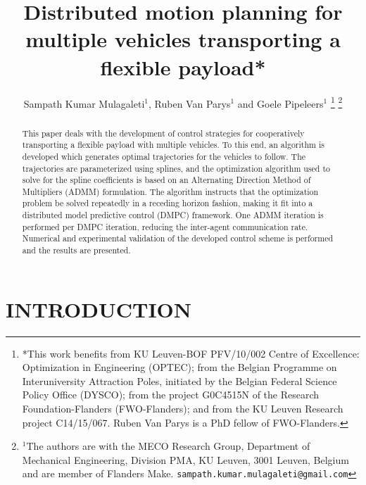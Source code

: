 \documentclass[letterpaper, 10 pt, conference]{ieeeconf}
\title{\LARGE \bf
Distributed motion planning for multiple
vehicles transporting a flexible payload*
}
\author{Sampath Kumar Mulagaleti$^{1}$, Ruben Van Parys$^{1}$ and Goele Pipeleers$^{1}$%
\thanks{*This work benefits from KU Leuven-BOF PFV/10/002 Centre of Excellence: Optimization in Engineering (OPTEC); from the Belgian Programme on Interuniversity Attraction Poles, initiated by the Belgian Federal Science Policy Office (DYSCO); from the project G0C4515N of the Research Foundation-Flanders (FWO-Flanders); and from the KU Leuven Research project C14/15/067. Ruben Van Parys is a PhD fellow of FWO-Flanders. }%
\thanks{$^{1}$The authors are with the MECO Research Group, Department of Mechanical Engineering, Division PMA, KU Leuven, 3001 Leuven, Belgium and are member of Flanders Make. \texttt{sampath.kumar.mulagaleti@gmail.com}}
}
\begin{document}
\maketitle
\thispagestyle{empty}
\pagestyle{empty}


\begin{abstract}
This paper deals with the development of control strategies for cooperatively transporting a flexible payload with multiple vehicles. To this end, an algorithm is
developed which generates optimal trajectories for the vehicles to follow. The trajectories are parameterized using splines, and the optimization algorithm used to solve for the spline coefficients is based on an Alternating Direction Method of Multipliers (ADMM) formulation. The algorithm instructs that the
optimization problem be solved repeatedly in a receding horizon fashion, making it fit into a distributed model predictive control (DMPC) framework. One ADMM iteration is performed per DMPC iteration, reducing the inter-agent communication rate. Numerical and experimental validation of the developed control scheme is performed and the results are presented.
\end{abstract}


\section{INTRODUCTION}
\end{document}
